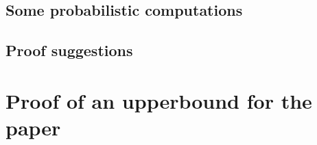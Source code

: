 



\subsection{Some probabilistic computations}


\subsection{Proof suggestions}


\section{Proof of an upperbound for the paper}

\renewcommand{\subsection}{\oldsubsection}
\renewcommand{\section}{\oldsection}